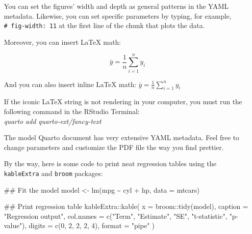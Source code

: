 \documentclass[
  12pt,
  letterpaper,
  DIV=11,
  numbers=noendperiod]{scrartcl}
\newenvironment{Shaded}{}{}
\newcommand{\AttributeTok}[1]{\textcolor[rgb]{0.65,0.15,0.64}{#1}}
\newcommand{\DecValTok}[1]{\textcolor[rgb]{0.60,0.41,0.00}{#1}}
\newcommand{\DocumentationTok}[1]{\textcolor[rgb]{0.89,0.34,0.29}{#1}}
\newcommand{\FunctionTok}[1]{\textcolor[rgb]{0.25,0.47,0.95}{#1}}
\newcommand{\NormalTok}[1]{\textcolor[rgb]{0.22,0.23,0.26}{#1}}
\newcommand{\OtherTok}[1]{\textcolor[rgb]{0.15,0.68,0.38}{#1}}
\newcommand{\SpecialCharTok}[1]{\textcolor[rgb]{0.00,0.52,0.74}{#1}}
\newcommand{\StringTok}[1]{\textcolor[rgb]{0.31,0.63,0.31}{#1}}
\begin{document}
You can set the figures' width and depth as general patterns in the YAML
metadata. Likewise, you can set specific parameters by typing, for
example, \texttt{\#\textbar{}\ fig-width:\ 11} at the first line of the
chunk that plots the data.

Moreover, you can insert {\LaTeX} math:

\[
\bar{y} = \frac{1}{n}\sum_{i=1}^n y_i
\]

And you can also insert inline {\LaTeX} math:
\(\bar{y} = \frac{1}{n}\sum_{i=1}^n y_i\)

\begin{tcolorbox}[enhanced jigsaw, left=2mm, opacityback=0, arc=.35mm, leftrule=.75mm, breakable, rightrule=.15mm, colbacktitle=quarto-callout-important-color!10!white, bottomtitle=1mm, toprule=.15mm, title=\textcolor{quarto-callout-important-color}{\faExclamation}\hspace{0.5em}{Install extension}, toptitle=1mm, titlerule=0mm, bottomrule=.15mm, colback=white, opacitybacktitle=0.6, colframe=quarto-callout-important-color-frame, coltitle=black]

If the iconic {\LaTeX} string is not rendering in your computer, you
must run the following command in the RStudio Terminal:\\

\emph{quarto add quarto-ext/fancy-text}

\end{tcolorbox}

The model Quarto document has very extensive YAML metadata. Feel free to
change parameters and customize the PDF file the way you find prettier.

By the way, here is some code to print neat regression tables using the
\texttt{kableExtra} and \texttt{broom} packages:

\begin{Shaded}
\begin{Highlighting}[]
\DocumentationTok{\#\# Fit the model}
\NormalTok{model }\OtherTok{\textless{}{-}} \FunctionTok{lm}\NormalTok{(mpg }\SpecialCharTok{\textasciitilde{}}\NormalTok{ cyl }\SpecialCharTok{+}\NormalTok{ hp, }\AttributeTok{data =}\NormalTok{ mtcars)}

\DocumentationTok{\#\# Print regression table}
\NormalTok{kableExtra}\SpecialCharTok{::}\FunctionTok{kable}\NormalTok{(}
  \AttributeTok{x =}\NormalTok{ broom}\SpecialCharTok{::}\FunctionTok{tidy}\NormalTok{(model), }
  \AttributeTok{caption =} \StringTok{"Regression output"}\NormalTok{,}
  \AttributeTok{col.names =} \FunctionTok{c}\NormalTok{(}\StringTok{"Term"}\NormalTok{, }\StringTok{"Estimate"}\NormalTok{, }\StringTok{"SE"}\NormalTok{, }\StringTok{"t{-}statistic"}\NormalTok{, }\StringTok{"p{-}value"}\NormalTok{),}
  \AttributeTok{digits =} \FunctionTok{c}\NormalTok{(}\DecValTok{0}\NormalTok{, }\DecValTok{2}\NormalTok{, }\DecValTok{2}\NormalTok{, }\DecValTok{2}\NormalTok{, }\DecValTok{4}\NormalTok{),}
  \AttributeTok{format =} \StringTok{"pipe"}
\NormalTok{)}
\end{Highlighting}
\end{Shaded}
\end{document}
